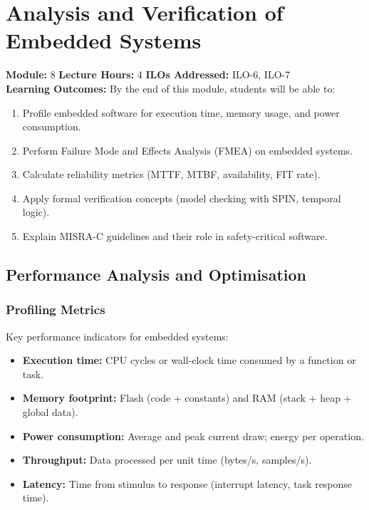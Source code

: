 
\chapter{Analysis and Verification of Embedded Systems}
\label{ch:analysis}

\begin{moduleinfo}
  \textbf{Module:} 8 \quad
  \textbf{Lecture Hours:} 4 \quad
  \textbf{ILOs Addressed:} ILO-6, ILO-7 \\[4pt]
  \textbf{Learning Outcomes:} By the end of this module, students will be able to:
  \begin{enumerate}[nosep]
    \item Profile embedded software for execution time, memory usage, and power consumption.
    \item Perform Failure Mode and Effects Analysis (FMEA) on embedded systems.
    \item Calculate reliability metrics (MTTF, MTBF, availability, FIT rate).
    \item Apply formal verification concepts (model checking with SPIN, temporal logic).
    \item Explain MISRA-C guidelines and their role in safety-critical software.
  \end{enumerate}
\end{moduleinfo}

\section{Performance Analysis and Optimisation}
\label{sec:ana:perf}

\subsection{Profiling Metrics}

Key performance indicators for embedded systems:
\begin{itemize}[nosep]
  \item \textbf{Execution time:} CPU cycles or wall-clock time consumed by a function or task.
  \item \textbf{Memory footprint:} Flash (code + constants) and RAM (stack + heap + global data).
  \item \textbf{Power consumption:} Average and peak current draw; energy per operation.
  \item \textbf{Throughput:} Data processed per unit time (bytes/s, samples/s).
  \item \textbf{Latency:} Time from stimulus to response (interrupt latency, task response time).
\end{itemize}

